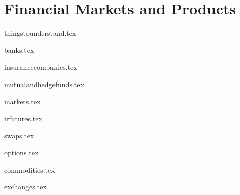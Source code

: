 \documentclass{report}
\begin{document}
	

\tableofcontents		

\part{Financial Markets and Products}

{thingstounderstand.tex}
\pagebreak

{banks.tex}
\pagebreak

{insurancecompanies.tex}
\pagebreak

{mutualandhedgefunds.tex}
\pagebreak

{markets.tex}
\pagebreak

{irfutures.tex}
\pagebreak

{swaps.tex}
\pagebreak

{options.tex}
\pagebreak

{commodities.tex}
\pagebreak

{exchanges.tex}
\pagebreak
\end{document}
